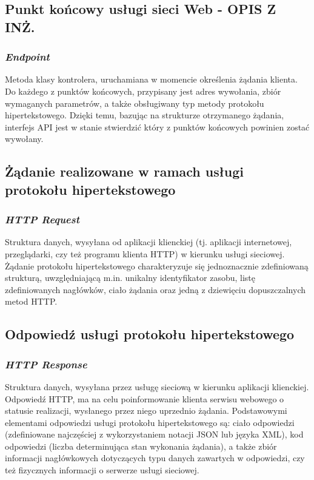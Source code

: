 \subsection*{Punkt końcowy usługi sieci Web - OPIS Z INŻ.}
\subsubsection{\textit{Endpoint}}
Metoda klasy kontrolera, uruchamiana w momencie określenia żądania klienta. Do każdego z punktów końcowych, przypisany jest adres wywołania, zbiór wymaganych parametrów, a także obsługiwany typ metody protokołu hipertekstowego. Dzięki temu, bazując na strukturze otrzymanego żądania, interfejs API jest w stanie stwierdzić który z punktów końcowych powinien zostać wywołany.

\subsection*{Żądanie realizowane w ramach usługi protokołu hipertekstowego}
\subsubsection{\textit{HTTP Request}}
Struktura danych, wysyłana od aplikacji klienckiej (tj. aplikacji internetowej, przeglądarki, czy też programu klienta HTTP) w kierunku usługi sieciowej. Żądanie protokołu hipertekstowego charakteryzuje się jednoznacznie zdefiniowaną strukturą, uwzględniającą m.in. unikalny identyfikator zasobu, listę zdefiniowanych nagłówków, ciało żądania oraz jedną z dziewięciu dopuszczalnych metod HTTP. 

\subsection*{Odpowiedź usługi protokołu hipertekstowego}
\subsubsection{\textit{HTTP Response}}
Struktura danych, wysyłana przez usługę sieciową w kierunku aplikacji klienckiej. Odpowiedź HTTP, ma na celu poinformowanie klienta serwisu webowego o statusie realizacji, wysłanego przez niego uprzednio żądania. Podstawowymi elementami odpowiedzi usługi protokołu hipertekstowego są: ciało odpowiedzi (zdefiniowane najczęściej z wykorzystaniem notacji JSON lub języka XML), kod odpowiedzi (liczba determinująca stan wykonania żądania), a także zbiór informacji nagłówkowych dotyczących typu danych zawartych w odpowiedzi, czy też fizycznych informacji o serwerze usługi sieciowej.

